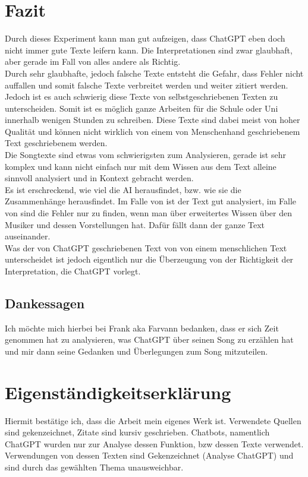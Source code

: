 \documentclass[twocolumn,10pt]{article}
\begin{document}
	\section{Fazit}
	Durch dieses Experiment kann man gut aufzeigen, dass ChatGPT\cite{ChatGPT} eben doch nicht immer gute Texte leifern kann. Die Interpretationen sind zwar glaubhaft, aber gerade im Fall von  alles andere als Richtig.\\
	Durch sehr glaubhafte, jedoch falsche Texte entsteht die Gefahr, dass Fehler nicht auffallen und somit falsche Texte verbreitet werden und weiter zitiert werden.\\	
	Jedoch ist es auch schwierig diese Texte von selbstgeschriebenen Texten zu unterscheiden. Somit ist es möglich ganze Arbeiten für die Schule oder Uni innerhalb wenigen Stunden zu schreiben. Diese Texte sind dabei meist von hoher Qualität und können nicht wirklich von einem von Menschenhand geschriebenem Text geschriebenem werden.\\	
	Die Songtexte sind etwas vom schwierigsten zum Analysieren, gerade  ist sehr komplex und kann nicht einfach nur mit dem Wissen aus dem Text alleine sinnvoll analysiert und in Kontext gebracht werden.\\	
	Es ist erschreckend, wie viel die AI herausfindet, bzw. wie sie die Zusammenhänge herausfindet. Im Falle von  ist der Text gut analysiert, im Falle von  sind die Fehler nur zu finden, wenn man über erweitertes Wissen über den Musiker und dessen Vorstellungen hat. Dafür fällt dann der ganze Text auseinander.\\	
	Was der von ChatGPT geschriebenen Text von  von einem menschlichen Text unterscheidet ist jedoch eigentlich nur die Überzeugung von der Richtigkeit der Interpretation, die ChatGPT vorlegt. 
	
	\clearpage

	


	\onecolumn	\listoffigures{}
	\printbibliography[title=Quellenverzeichnis]
	\clearpage
	
	\subsection{Dankessagen}
	Ich möchte mich hierbei bei Frank aka Farvann bedanken, dass er sich Zeit genommen hat zu analysieren, was ChatGPT über seinen Song zu erzählen hat und mir dann seine Gedanken und Überlegungen zum Song  mitzuteilen.
	
	\clearpage	
	\onehalfspacing
	\section{Eigenständigkeitserklärung}
	Hiermit bestätige ich, dass die Arbeit mein eigenes Werk ist. Verwendete Quellen sind gekenzeichnet, Zitate sind kursiv geschrieben. Chatbots, namentlich ChatGPT\cite{ChatGPT} wurden nur zur Analyse dessen Funktion, bzw dessen Texte verwendet. Verwendungen von dessen Texten sind Gekenzeichnet (Analyse ChatGPT) und sind durch das gewählten Thema unausweichbar.
	

	
\end{document}
